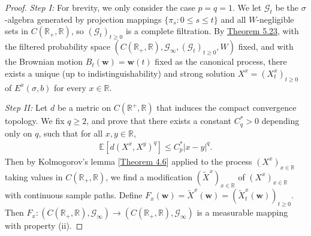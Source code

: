 \documentclass{article}
\numberwithin{equation}{section}
\newcommand{\E}{\mathbb{E}}
\newcommand{\bfw}{\mathbf{w}}
\theoremstyle{plain}
\theoremstyle{definition}
\begin{document}
\begin{proof}
\textit{Step I:} For brevity, we only consider the case $p=q=1$. We let $\mathscr{G}_t$ be the $\sigma$-algebra generated by projection mappings $\{\pi_s:0\leq s\leq t\}$ and all $W$-negligible sets in $C(\mathbb{R}_+,\mathbb{R})$, so $(\mathscr{G}_t)_{t\geq 0}$ is a complete filtration. By \hyperref[thm:5.23]{Theorem 5.23}, with the filtered probability space $(C(\mathbb{R}_+,\mathbb{R}),\mathscr{G}_\infty,(\mathscr{G}_t)_{t\geq 0},W)$ fixed, and with the Brownian motion $B_t(\bfw)=\bfw(t)$ fixed as the canonical process, there exists a unique (up to indistinguishability) and strong solution $X^x=(X_t^x)_{t\geq 0}$ of $E^x(\sigma,b)$ for every $x\in\mathbb{R}$. \vspace{0.1cm}

\textit{Step II:} Let $d$ be a metric on $C(\mathbb{R}^+,\mathbb{R})$ that induces the compact convergence topology. We fix $q\geq 2$, and prove that there exists a constant $C_q^*>0$ depending only on $q$, such that for all $x,y\in\mathbb{R}$, 
\begin{align*}
	\E\left[d(X^x,X^y)^q\right]\leq C_p^*\vert x-y\vert^q.\tag{5.14}\label{eq:5.14}
\end{align*}
Then by Kolmogorov's lemma [\hyperref[thm:4.6]{Theorem 4.6}] applied to the process $(X^x)_{x\in\mathbb{R}}$ taking values in $C(\mathbb{R}_+,\mathbb{R})$, we find a modification $(\widetilde{X}^x)_{x\in\mathbb{R}}$ of $(X^x)_{x\in\mathbb{R}}$ with continuous sample paths. Define $F_x(\bfw)=\widetilde{X}^x(\bfw)=(\widetilde{X}^x_t(\bfw))_{t\geq 0}$. Then $F_x:(C(\mathbb{R}_+,\mathbb{R}),\mathscr{G}_\infty)\to (C(\mathbb{R}_+,\mathbb{R}),\mathscr{G}_\infty)$ is a measurable mapping with property (ii).


\end{proof}
\end{document}
